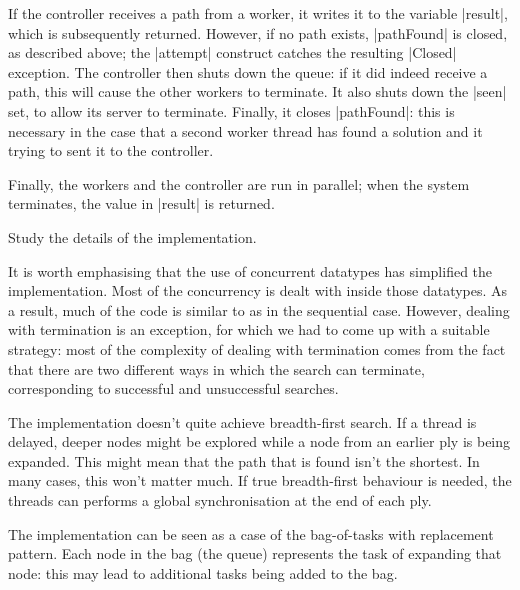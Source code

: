 If the controller receives a path from a worker, it writes it to the variable
|result|, which is subsequently returned.  However, if no path exists,
|pathFound| is closed, as described above; the |attempt| construct catches the
resulting |Closed| exception.  The controller then shuts down the queue: if it
did indeed receive a path, this will cause the other workers to terminate.  It
also shuts down the |seen| set, to allow its server to terminate.  Finally, it
closes |pathFound|: this is necessary in the case that a second worker thread
has found a solution and it trying to sent it to the controller. 

Finally, the workers and the controller are run in parallel; when the system
terminates, the value in |result| is returned. 

\begin{instruction}
Study the details of the implementation.
\end{instruction}

It is worth emphasising that the use of concurrent datatypes has simplified
the implementation.  Most of the concurrency is dealt with inside those
datatypes.  As a result, much of the code is similar to as in the sequential
case.  However, dealing with termination is an exception, for which we had to
come up with a suitable strategy: most of the complexity of dealing with
termination comes from the fact that there are two different ways
in which the search can terminate, corresponding to successful and
unsuccessful searches. 

The implementation doesn't quite achieve breadth-first search.  If a thread is
delayed, deeper nodes might be explored while a node from an earlier ply is
being expanded.  This might mean that the path that is found isn't the
shortest.  In many cases, this won't matter much.  If true breadth-first
behaviour is needed, the threads can performs a global synchronisation at the
end of each ply.

The implementation can be seen as a case of the bag-of-tasks with replacement
pattern.  Each node in the bag (the queue) represents the task of expanding
that node: this may lead to additional tasks being added to the bag.

